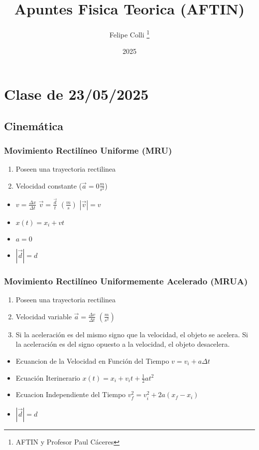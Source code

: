 \documentclass[11pt]{article}
\title{Apuntes Fisica Teorica (AFTIN)}
\author{Felipe Colli \thanks{AFTIN y Profesor Paul Cáceres}}
\date{2025}
\begin{document}
\maketitle
\tableofcontents
\newpage

\section{Clase de 23/05/2025}
    \subsection{Cinemática}
        \subsubsection{Movimiento Rectilíneo Uniforme (MRU)}
            \begin{enumerate}
                \item Poseen una trayectoria rectilinea
                \item Velocidad constante ($\vec{a}=0\frac{m}{s^2}$)
            \end{enumerate}
            \begin{itemize}    
                \item $v = \frac{\Delta x}{\Delta t}$ $\vec{v}=\frac{\vec{d}}{t}$ $(\frac{m}{s})$ $|\vec{v}|=v$
                \item $x(t) = x_i + vt$
                \item $a = 0$
                \item $|\vec{d}|=d$
            \end{itemize}

        \subsubsection{Movimiento Rectilíneo Uniformemente Acelerado (MRUA)}
            \begin{enumerate}
                \item Poseen una trayectoria rectilinea
                \item Velocidad variable $\vec{a}=\frac{\Delta v}{\Delta t}$ $(\frac{m}{s^2})$ 
                \item Si la aceleración es del mismo signo que la velocidad, el objeto se acelera. Si la aceleración es del signo opuesto a la velocidad, el objeto desacelera.
            \end{enumerate}
            \begin{itemize}
                \item Ecuancion de la Velocidad en Función del Tiempo $v = v_i + a\Delta t$
                \item Ecuación Iterinerario $x(t) = x_i + v_i t + \frac{1}{2}at^2$
                \item Ecuacion Independiente del Tiempo $v_f^2 = v_i^2 + 2a(x_f-x_i)$ 
                \item $|\vec{d}|=d$
            \end{itemize}
\end{document}
